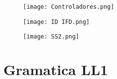 \documentclass{article}
\begin{document}
    \begin{figure}[htbp]
        \centering
        \texttt{[image: Controladores.png]}
        \label{fig:ejemplo}
    \end{figure}

    \begin{figure}[htbp]
        \centering
        \texttt{[image: ID IFD.png]}
        \label{fig:ejemplo}
    \end{figure}

    \begin{figure}[htbp]
        \centering
        \texttt{[image: SS2.png]}
        \label{fig:ejemplo}
    \end{figure}

\clearpage
\section{Gramatica LL1}
\end{document}
